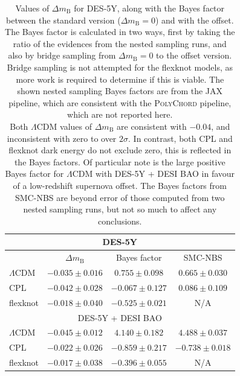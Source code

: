 \documentclass[fleqn,usenatbib]{mnras}
\newcommand{\lcdm}{$\Lambda$CDM}
\newcommand{\dmb}{\ensuremath{\Delta m_\mathrm B}}
\begin{document}
    \begin{table}
        \caption{
            Values of \dmb{} for DES-5Y, along with the Bayes factor between the standard version ($\dmb{} = 0$) and with the offset.
            The Bayes factor is calculated in two ways, first by taking the ratio of the evidences from the nested sampling runs, and also by bridge sampling from $\dmb{}=0$ to the offset version.
            Bridge sampling is not attempted for the flexknot models, as more work is required to determine if this is viable.
            The shown nested sampling Bayes factors are from the \textsc{JAX} pipeline, which are consistent with the \textsc{PolyChord} pipeline, which are not reported here.\\
            Both \lcdm{} values of \dmb{} are consistent with $-0.04$, and inconsistent with zero to over $2\sigma$.
            In contrast, both CPL and flexknot dark energy do not exclude zero, this is reflected in the Bayes factors.
            Of particular note is the large positive Bayes factor for \lcdm{} with DES-5Y + DESI BAO in favour of a low-redshift supernova offset.
            The Bayes factors from SMC-NBS are beyond error of those computed from two nested sampling runs, but not so much to affect any conclusions.
        }\label{tab:des5y}
        \begin{center}
            \begin{tabular}[c]{|l|c|c|c|}
                \hline
                \multicolumn{4}{|c|}{DES-5Y}\\
                \hline
                & \dmb{} & Bayes factor & SMC-NBS \\
                \hline
                \lcdm{} & $-0.035 \pm 0.016$ & $0.755 \pm 0.098$ & $0.665 \pm 0.030$ \\
                CPL & $-0.042 \pm 0.028$ & $-0.067 \pm 0.127$ & $0.086 \pm 0.109$ \\
                flexknot & $-0.018 \pm 0.040$ & $-0.525 \pm 0.021$ & N/A \\
                \hline
                \multicolumn{4}{|c|}{DES-5Y + DESI BAO}\\
                \hline
                \lcdm{} & $-0.045 \pm 0.012$ & $4.140 \pm 0.182$ & $4.488 \pm 0.037$ \\
                CPL & $-0.022 \pm 0.026$ & $-0.859 \pm 0.217$ & $-0.738 \pm 0.018$ \\
                flexknot & $-0.017 \pm 0.038$ & $-0.396 \pm 0.055$ & N/A \\
                \hline
            \end{tabular}
        \end{center}
    \end{table}
\end{document}
